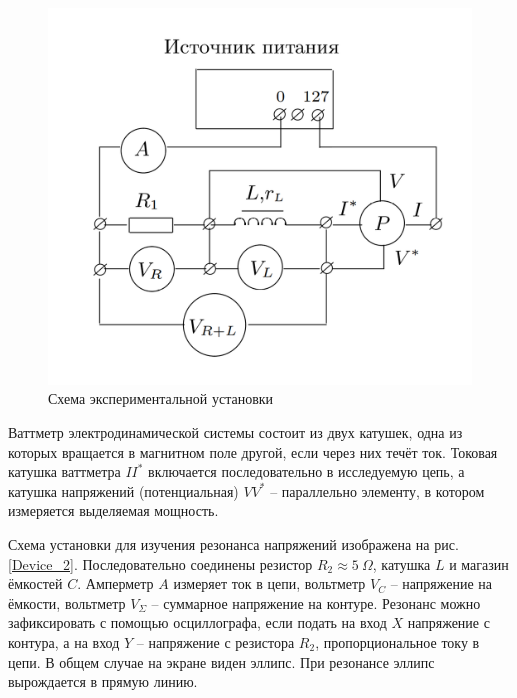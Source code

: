 \documentclass[a4paper, 12pt]{article}
\begin{document}
        \begin{figure}[ht]
            \centering
            \includegraphics[scale=0.35]{img/Device.png}
            \caption{Схема экспериментальной установки} \label{Device}
        \end{figure}

        Ваттметр электродинамической системы состоит из двух катушек, одна из которых вращается в магнитном поле другой, если через них течёт ток. Токовая катушка ваттметра $II^*$ включается последовательно в исследуемую цепь, а катушка напряжений (потенциальная) $VV^*$ -- параллельно элементу, в котором измеряется выделяемая мощность.

        Схема установки для изучения резонанса напряжений изображена на рис. \ref{Device_2}. Последовательно соединены резистор $R_2\approx5~\Omega$, катушка $L$ и магазин ёмкостей $C$. Амперметр $A$ измеряет ток в цепи, вольтметр $V_C$ -- напряжение на ёмкости, вольтметр $V_{\Sigma}$ -- суммарное напряжение на контуре. Резонанс можно зафиксировать с помощью осциллографа, если подать на вход $X$ напряжение с контура, а на вход $Y$ -- напряжение с резистора $R_2$, пропорциональное току в цепи. В общем случае на экране виден эллипс. При резонансе эллипс вырождается в прямую линию.
\end{document}
